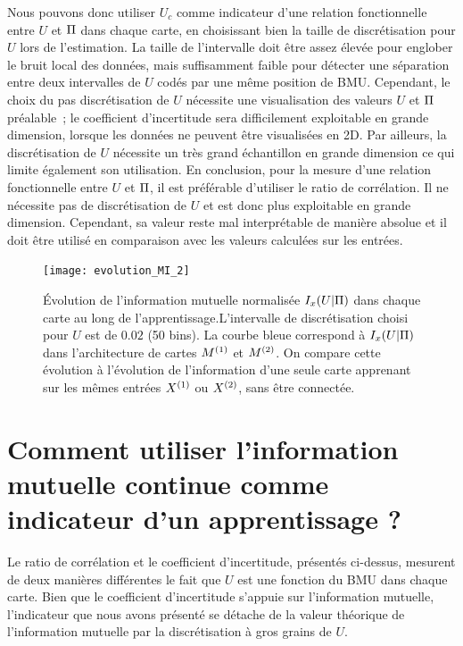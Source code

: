 \documentclass[../main]{subfiles}
\begin{document}
Nous pouvons donc utiliser $U_c$ comme indicateur d'une relation fonctionnelle entre $U$ et $\Pi$ dans chaque carte, en choisissant bien la taille de discrétisation pour $U$ lors de l'estimation. 
La taille de l'intervalle doit être assez élevée pour englober le bruit local des données, mais suffisamment faible pour détecter une séparation entre deux intervalles de $U$ codés par une même position de BMU.
Cependant, le choix du pas discrétisation de $U$ nécessite une visualisation des valeurs $U$ et $\Pi$ préalable~; le coefficient d'incertitude sera difficilement exploitable en grande dimension, lorsque les données ne peuvent être visualisées en 2D. Par ailleurs, la discrétisation de $U$ nécessite un très grand échantillon en grande dimension ce qui limite également son utilisation.
En conclusion, pour la mesure d'une relation fonctionnelle entre $U$ et $\Pi$, il est préférable d'utiliser le ratio de corrélation. Il ne nécessite pas de discrétisation de $U$ et est donc plus exploitable en grande dimension. Cependant, sa valeur reste mal interprétable de manière absolue et il doit être utilisé en comparaison avec les valeurs calculées sur les entrées.

\begin{figure}
\centering\texttt{[image: evolution\_MI\_2]}
\caption{\'Evolution de l'information mutuelle normalisée $I_x(U|\Pi)$ dans chaque carte au long de l'apprentissage.L'intervalle de discrétisation choisi pour $U$ est de $0.02$ (50 bins).
La courbe bleue correspond à $I_x(U|\Pi)$ dans l'architecture de cartes $M^{({1})}$ et $M^{({2})}$. On compare cette évolution à l'évolution de l'information d'une seule carte apprenant sur les mêmes entrées $X^{({1})}$ ou $X^{({2})}$, sans être connectée.}
\label{fig:MI_evol}
\end{figure}

\section{Comment utiliser l'information mutuelle continue comme indicateur d'un apprentissage ?}

Le ratio de corrélation et le coefficient d'incertitude, présentés ci-dessus, mesurent de deux manières différentes le fait que $U$ est une fonction du BMU dans chaque carte.
Bien que le coefficient d'incertitude s'appuie sur l'information mutuelle, l'indicateur que nous avons présenté se détache de la valeur théorique de l'information mutuelle par la discrétisation à gros grains de $U$.
\end{document}
